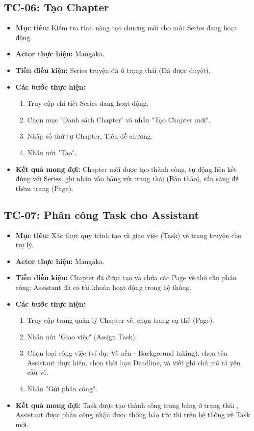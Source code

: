 \subsection{TC-06: Tạo Chapter}
\label{subsec:tc06_create_chapter}
\begin{itemize}
    \item \textbf{Mục tiêu:} Kiểm tra tính năng tạo chương mới cho một Series đang hoạt động.
    \item \textbf{Actor thực hiện:} Mangaka.
    \item \textbf{Tiền điều kiện:} Series truyện đã ở trạng thái  (Đã được duyệt).
    \item \textbf{Các bước thực hiện:}
    \begin{enumerate}
        \item Truy cập chi tiết Series đang hoạt động.
        \item Chọn mục "Danh sách Chapter" và nhấn "Tạo Chapter mới".
        \item Nhập số thứ tự Chapter, Tiêu đề chương.
        \item Nhấn nút "Tạo".
    \end{enumerate}
    \item \textbf{Kết quả mong đợi:} Chapter mới được tạo thành công, tự động liên kết đúng với Series, ghi nhận vào bảng  với trạng thái  (Bản thảo), sẵn sàng để thêm trang (Page).
\end{itemize}

\subsection{TC-07: Phân công Task cho Assistant}
\label{subsec:tc07_assign_task}
\begin{itemize}
    \item \textbf{Mục tiêu:} Xác thực quy trình tạo và giao việc (Task) vẽ trang truyện cho trợ lý.
    \item \textbf{Actor thực hiện:} Mangaka.
    \item \textbf{Tiền điều kiện:} Chapter đã được tạo và chứa các Page vẽ thô cần phân công; Assistant đã có tài khoản hoạt động trong hệ thống.
    \item \textbf{Các bước thực hiện:}
    \begin{enumerate}
        \item Truy cập trang quản lý Chapter vẽ, chọn trang cụ thể (Page).
        \item Nhấn nút "Giao việc" (Assign Task).
        \item Chọn loại công việc (ví dụ: Vẽ nền - Background inking), chọn tên Assistant thực hiện, chọn thời hạn Deadline, và viết ghi chú mô tả yêu cầu vẽ.
        \item Nhấn "Gửi phân công".
    \end{enumerate}
    \item \textbf{Kết quả mong đợi:} Task được tạo thành công trong bảng  ở trạng thái , Assistant được phân công nhận được thông báo tức thì trên hệ thống về Task mới.
\end{itemize}

